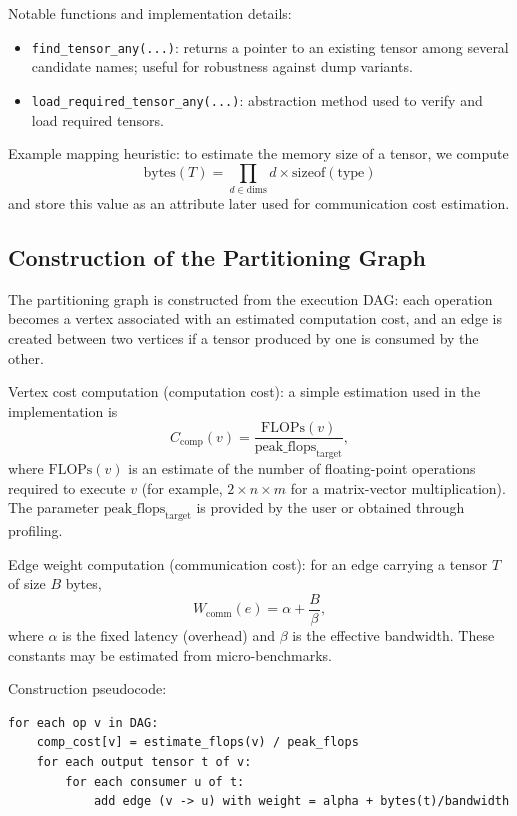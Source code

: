 \documentclass[11pt,a4paper]{article}
\begin{document}
Notable functions and implementation details:
\begin{itemize}[leftmargin=*]
	\item \texttt{find\_tensor\_any(...)}: returns a pointer to an existing tensor among several candidate names; useful for robustness against dump variants.
	\item \texttt{load\_required\_tensor\_any(...)}: abstraction method used to verify and load required tensors.
\end{itemize}

Example mapping heuristic: to estimate the memory size of a tensor, we compute
\[
\mathrm{bytes}(T) = \prod_{d\in \mathrm{dims}} d \times \mathrm{sizeof}(\text{type})
\]
and store this value as an attribute later used for communication cost estimation.

\subsection{Construction of the Partitioning Graph}

The partitioning graph is constructed from the execution DAG: each operation becomes a vertex associated with an estimated computation cost, and an edge is created between two vertices if a tensor produced by one is consumed by the other.

Vertex cost computation (computation cost): a simple estimation used in the implementation is
\[
C_{\mathrm{comp}}(v) = \frac{\mathrm{FLOPs}(v)}{\mathrm{peak\_flops}_{\mathrm{target}}},
\]
where $\mathrm{FLOPs}(v)$ is an estimate of the number of floating-point operations required to execute $v$ (for example, $2\times n \times m$ for a matrix-vector multiplication). The parameter $\mathrm{peak\_flops}_{\mathrm{target}}$ is provided by the user or obtained through profiling.

Edge weight computation (communication cost): for an edge carrying a tensor $T$ of size $B$ bytes,
\[
W_{\mathrm{comm}}(e) = \alpha + \frac{B}{\beta},
\]
where $\alpha$ is the fixed latency (overhead) and $\beta$ is the effective bandwidth. These constants may be estimated from micro-benchmarks.

Construction pseudocode:
\begin{verbatim}
for each op v in DAG:
	comp_cost[v] = estimate_flops(v) / peak_flops
	for each output tensor t of v:
		for each consumer u of t:
			add edge (v -> u) with weight = alpha + bytes(t)/bandwidth
\end{verbatim}
\end{document}
